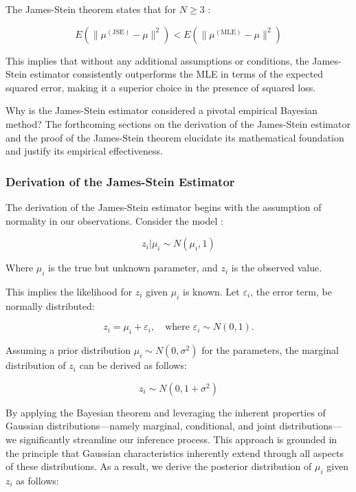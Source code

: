 The James-Stein theorem states that for $N \geq 3$ \cite{james1992estimation,efron2012large}:

\begin{equation}
    E(\|\mu^{(\text{JSE})} - \mu\|^2) < E(\|\mu^{(\text{MLE})} - \mu\|^2)
\end{equation}

This implies that without any additional assumptions or conditions, the James-Stein estimator consistently outperforms the MLE in terms of the expected squared error, making it a superior choice in the presence of squared loss. 

Why is the James-Stein estimator considered a pivotal empirical Bayesian method? The forthcoming sections on the derivation of the James-Stein estimator and the proof of the James-Stein theorem elucidate its mathematical foundation and justify its empirical effectiveness.

\subsubsection{Derivation of the James-Stein Estimator}

The derivation of the James-Stein estimator begins with the assumption of normality in our observations. Consider the model \cite{efron2012large}:

\begin{equation}
    z_i | \mu_i \sim N(\mu_i, 1)
\end{equation}

Where $\mu_i$ is the true but unknown parameter, and $z_i$ is the observed value.

This implies the likelihood for \(z_i\) given \(\mu_i\) is known. Let \(\varepsilon_i\), the error term, be normally distributed:

\begin{equation}
    z_i = \mu_i + \varepsilon_i, \quad \text{where } \varepsilon_i \sim N(0, 1).
\end{equation}

Assuming a prior distribution \(\mu_i \sim N(0, \sigma^2)\) for the parameters, the marginal distribution of \(z_i\) can be derived as follows:

\begin{equation}
    z_i \sim N(0, 1+\sigma^2)
\end{equation}

By applying the Bayesian theorem and leveraging the inherent properties of Gaussian distributions—namely marginal, conditional, and joint distributions—we significantly streamline our inference process. This approach is grounded in the principle that Gaussian characteristics inherently extend through all aspects of these distributions. As a result, we derive the posterior distribution of \(\mu_i\) given \(z_i\) as follows:

